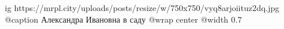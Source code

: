  
 
 
 
 

\ifcmt
  ig https://mrpl.city/uploads/posts/resize/w/750x750/vyq8arjoiituz2dq.jpg
	@caption Александра Ивановна в саду
  @wrap center
  @width 0.7
\fi
